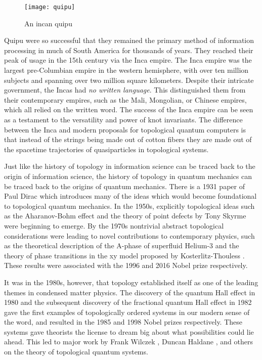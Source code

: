 \begin{figure}
\begin{center}
\texttt{[image: quipu]}
\caption{An incan quipu}
\label{quipu}
\end{center}
\end{figure}


Quipu were so successful that they remained the primary method of information processing in much of South America for thousands of years. They reached their peak of usage in the 15th century via the Inca empire. The Inca empire was the largest pre-Columbian empire in the western hemisphere, with over ten million subjects and spanning over two million square kilometers. Despite their intricate government, the Incas had {\em no written language}. This distinguished them from their contemporary empires, such as the Mali, Mongolian, or Chinese empires, which all relied on the written word. The success of the Inca empire can be seen as a testament to the versatility and power of knot invariants. The difference between the Inca and modern proposals for topological quantum computers is that instead of the strings being made out of cotton fibers they are made out of the spacetime trajectories of quasiparticles in topological systems.

Just like the history of topology in information science can be traced back to the origin of information science, the history of topology in quantum mechanics can be traced back to the origins of quantum mechanics. There is a 1931 paper of Paul Dirac \cite{dirac1931quantised} which introduces many of the ideas which would become foundational to topological quantum mechanics. In the 1950s, explicitly topological ideas such as the Aharanov-Bohm effect \cite{aharonov1959significance} and the theory of point defects by Tony Skyrme \cite{skyrme1962unified} were beginning to emerge. By the 1970s nontrivial abstract topological considerations were leading to novel contributions to contemporary physics, such as the theoretical description of the A-phase of superfluid Helium-3 \cite{anderson1977phase} and the theory of phase transitions in the xy model proposed by Kosterlitz-Thouless \cite{kosterlitz1973ordering}. These results were associated with the 1996 and 2016 Nobel prize respectively.

It was in the 1980s, however, that topology established itself as one of the leading themes in condensed matter physics. The discovery of the quantum Hall effect in 1980 \cite{klitzing1980new} and the subsequent discovery of the fractional quantum Hall effect in 1982 \cite{tsui1982two} gave the first examples of topologically ordered systems in our modern sense of the word, and resulted in the 1985 and 1998 Nobel prizes respectively. These systems gave theorists the license to dream big about what possibilities could lie ahead. This led to major work by Frank Wilczek \cite{wilczek1982quantum, arovas1985statistical}, Duncan Haldane \cite{haldane1983nonlinear, haldane1988model}, and others on the theory of topological quantum systems.

